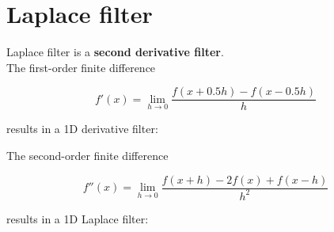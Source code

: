 \documentclass{article}
\begin{document}
\newpage

\section*{Laplace filter}

Laplace filter is a \textbf{second derivative filter}. \\

The first-order finite difference

\begin{center}
    \begin{equation*}
        f'(x) = \lim_{h\to 0} \frac{f(x + 0.5h) - f(x - 0.5h)}{h}
    \end{equation*}
\end{center}

results in a 1D derivative filter:

\begin{center}
\end{center}

\vspace{0.5cm}

The second-order finite difference

\begin{center}
    \begin{equation*}
        f''(x) = \lim_{h\to 0} \frac{f(x + h) - 2f(x) + f(x - h)}{h^2}
    \end{equation*}
\end{center}

results in a 1D Laplace filter:

\begin{center}
\end{center}

\hspace{2cm}
\end{document}
